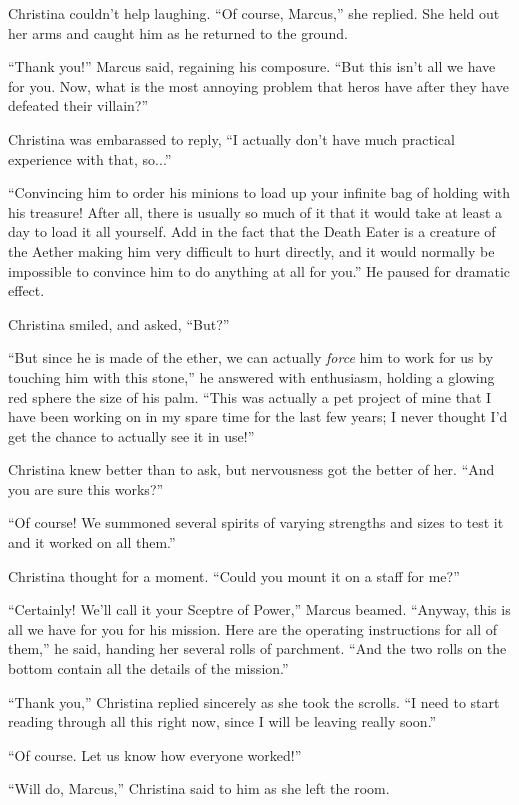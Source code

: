 \documentclass[showtrims,b6paper,draft,10pt]{memoir}
\begin{document}
Christina couldn't help laughing.  ``Of course, Marcus,'' she replied.  She held out her arms and caught him as he returned to the ground.

``Thank you!'' Marcus said, regaining his composure.  ``But this isn't all we have for you.  Now, what is the most annoying problem that heros have after they have defeated their villain?''

Christina was embarassed to reply, ``I actually don't have much practical experience with that, so...''

``Convincing him to order his minions to load up your infinite bag of holding with his treasure!  After all, there is usually so much of it that it would take at least a day to load it all yourself.  Add in the fact that the Death Eater is a creature of the Aether making him very difficult to hurt directly, and it would normally be impossible to convince him to do anything at all for you.''  He paused for dramatic effect.

Christina smiled, and asked, ``But?''

``But since he is made of the ether, we can actually \emph{force} him to work for us by touching him with this stone,'' he answered with enthusiasm, holding a glowing red sphere the size of his palm.  ``This was actually a pet project of mine that I have been working on in my spare time for the last few years;  I never thought I'd get the chance to actually see it in use!''

Christina knew better than to ask, but nervousness got the better of her.  ``And you are sure this works?''

``Of course!  We summoned several spirits of varying strengths and sizes to test it and it worked on all them.''

Christina thought for a moment.  ``Could you mount it on a staff for me?''

``Certainly!  We'll call it your Sceptre of Power,''  Marcus beamed.  ``Anyway, this is all we have for you for his mission.  Here are the operating instructions for all of them,'' he said, handing her several rolls of parchment.  ``And the two rolls on the bottom contain all the details of the mission.''

``Thank you,'' Christina replied sincerely as she took the scrolls.  ``I need to start reading through all this right now, since I will be leaving really soon.''

``Of course.  Let us know how everyone worked!''

``Will do, Marcus,''  Christina said to him as she left the room.
\end{document}
